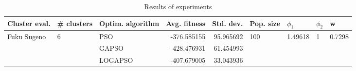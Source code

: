 \begin{table}
\centering
\caption{Results of experiments}
\begin{tabular}{lllrrllll}
\toprule
               Cluster eval. &        \# clusters & Optim. algorithm &  Avg. fitness &  Std. dev. &            Pop. size &               $\phi_{1}$ &         $\phi_{2}$ &                       w \\
\midrule
\multirow{3}{*}{Fuku Sugeno} & \multirow{3}{*}{6} &              PSO &   -376.585155 &  95.965692 & \multirow{3}{*}{100} & \multirow{3}{*}{1.49618} & \multirow{3}{*}{1} & \multirow{3}{*}{0.7298} \\
                             &                    &            GAPSO &   -428.476931 &  61.454993 &                      &                          &                    &                         \\
                             &                    &          LOGAPSO &   -407.679005 &  33.043936 &                      &                          &                    &                         \\
\bottomrule
\end{tabular}
\end{table}

